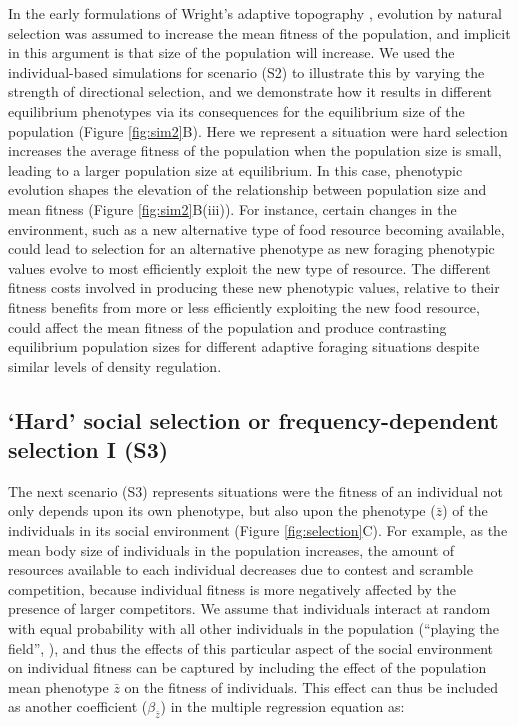 \documentclass{article}
\begin{document}
In the early formulations of Wright's adaptive topography \citep{Wright1931}, evolution by natural selection was assumed to increase the mean fitness of the population, and implicit in this argument is that size of the population will increase. We used the individual-based simulations for scenario (S2) to illustrate this by varying the strength of directional selection, and we demonstrate how it results in different equilibrium phenotypes via its consequences for the equilibrium size of the population (Figure \ref{fig:sim2}B). Here we represent a situation were hard selection increases the average fitness of the population when the population size is small, leading to a larger population size at equilibrium. In this case, phenotypic evolution shapes the elevation of the relationship between population size and mean fitness (Figure \ref{fig:sim2}B(iii)).  For instance, certain changes in the environment, such as a new alternative type of food resource becoming available, could lead to selection for an alternative phenotype as new foraging phenotypic values evolve to most efficiently exploit the new type of resource. The different fitness costs involved in producing these new phenotypic values, relative to their fitness benefits from more or less efficiently exploiting the new food resource, could affect the mean fitness of the population and produce contrasting equilibrium population sizes for different adaptive foraging situations despite similar levels of density regulation.

 
\subsection{`Hard' social selection or frequency-dependent selection I (S3)}
The next scenario (S3) represents situations were the fitness of an individual not only depends upon its own phenotype, but also upon the phenotype ($\bar{z}$) of the individuals in its social environment (Figure \ref{fig:selection}C). For example, as the mean body size of individuals in the population increases, the amount of resources available to each individual decreases due to contest and scramble competition, because individual fitness is more negatively affected by the presence of larger competitors. We assume that individuals interact at random with equal probability with all other individuals in the population (“playing the field”, \cite{MaynardSmith1982}), and thus the effects of this particular aspect of the social environment on individual fitness can be captured by including the effect of the population mean phenotype $\bar{z}$ on the fitness of individuals. This effect can thus be included as another coefficient ($\beta_{\bar{z}}$) in the multiple regression equation as:  
\end{document}
